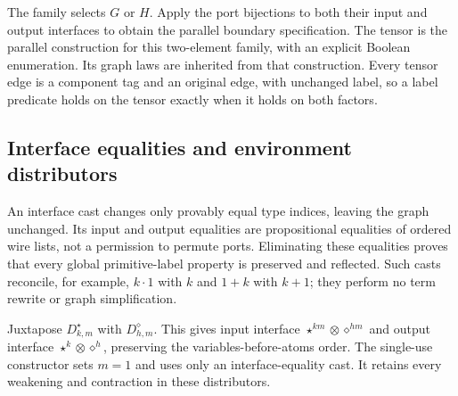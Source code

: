 





The family selects $G$ or $H$. Apply the port bijections to both their
input and output interfaces to obtain the parallel boundary specification.
The tensor is the parallel construction for this two-element family, with
an explicit Boolean enumeration. Its graph laws are inherited from that
construction. Every tensor edge is a component tag and an original edge,
with unchanged label, so a label predicate holds on the tensor exactly
when it holds on both factors.





\subsection{Interface equalities and environment distributors}

An interface cast changes only provably equal type indices, leaving the
graph unchanged. Its input and output equalities are propositional equalities
of ordered wire lists, not a permission to permute ports. Eliminating these
equalities proves that every global primitive-label property is preserved
and reflected. Such casts reconcile, for example, $k\cdot1$ with $k$ and
$1+k$ with $k+1$; they perform no term rewrite or graph simplification.



Juxtapose $D^{\star}_{k,m}$ with $D^{\diamond}_{h,m}$. This gives input
interface $\star^{km}\otimes\diamond^{hm}$ and output interface
$\star^k\otimes\diamond^h$, preserving the variables-before-atoms order.
The single-use constructor sets $m=1$ and uses only an interface-equality
cast. It retains every weakening and contraction in these distributors.

